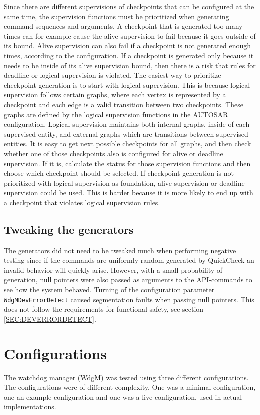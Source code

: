 Since there are different supervisions of checkpoints that can be configured at
the same time, the supervision functions must be prioritized when generating
command sequences and arguments. A checkpoint that is generated too many times
can for example cause the alive supervision to fail because it goes outside of
its bound. Alive supervision can also fail if a checkpoint is not generated
enough times, according to the configuration. If a checkpoint is generated only
because it needs to be inside of its alive supervision bound, then there is a
risk that rules for deadline or logical supervision is violated. The easiest way
to prioritize checkpoint generation is to start with logical supervision. This
is because logical supervision follows certain graphs, where each vertex is
represented by a checkpoint and each edge is a valid transition between two
checkpoints. These graphs are defined by the logical supervision functions in
the AUTOSAR configuration.  Logical supervision maintains both internal graphs,
inside of each supervised entity, and external graphs which are transitions
between supervised entities. It is easy to get next possible checkpoints for all
graphs, and then check whether one of those checkpoints also is configured for
alive or deadline supervision. If it is, calculate the status for those
supervision functions and then choose which checkpoint should be selected.  If
checkpoint generation is not prioritized with logical supervision as foundation,
alive supervision or deadline supervision could be used. This is harder because
it is more likely to end up with a checkpoint that violates logical supervision
rules.

\subsection{Tweaking the generators}
The generators did not need to be tweaked much when performing
negative testing since if the commands are uniformly random generated
by QuickCheck an invalid behavior will quickly arise. However, with a
small probability of generation, null pointers were also passed as
arguments to the API-commands to see how the system behaved. Turning
of the configuration parameter \lstinline!WdgMDevErrorDetect! caused
segmentation faults when passing null pointers. This does not follow
the requirements for functional safety, see section
\ref{SEC:DEVERRORDETECT}.

\section{Configurations}
The watchdog manager (WdgM) was tested using three different
configurations. The configurations were of different complexity. One
was a minimal configuration, one an example configuration and one was
a live configuration, used in actual implementations.

